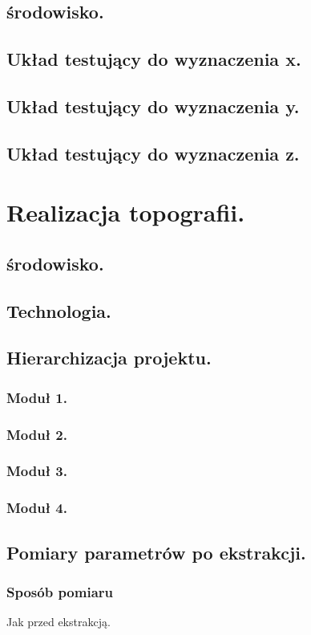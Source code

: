 \documentclass[10pt,a4paper]{report}
\begin{document}
	\section{środowisko.}
	\section{Układ testujący do wyznaczenia x.}
	\section{Układ testujący do wyznaczenia y.}
	\section{Układ testujący do wyznaczenia z.}
	
	\chapter{Realizacja topografii.}
	\section{środowisko.}
	\section{Technologia.}
	\section{Hierarchizacja projektu.}
	\subsection{Moduł 1.}
	\subsection{Moduł 2.}
	\subsection{Moduł 3.}
	\subsection{Moduł 4.}
	
	\section{Pomiary parametrów po ekstrakcji.}
	\subsection{Sposób pomiaru}
	Jak przed ekstrakcją.
\end{document}
